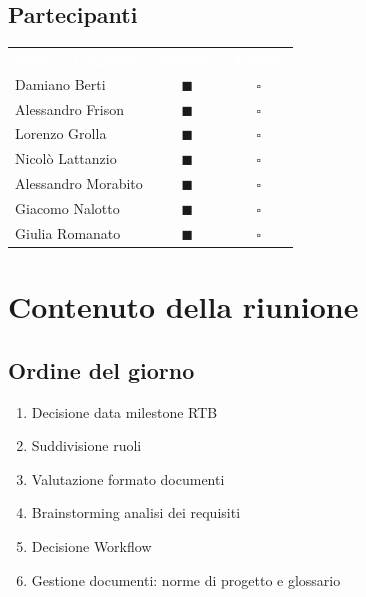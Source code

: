 \documentclass[a4paper, 11pt]{article}
\begin{document}
\subsection{Partecipanti}
\begin{center}
    \begin{tabular}{>{\raggedright\arraybackslash}p{6cm} c c}
        \rowcolor{AccentColor}
        \textcolor{white}{\textbf{Nome e Cognome}} & 
        \textcolor{white}{\textbf{Presente}} & 
        \textcolor{white}{\textbf{Assente}} \\
        
        Damiano Berti     & \textcolor{AccentColor}{$\blacksquare$}    & $\square$        \\
        Alessandro Frison     & \textcolor{AccentColor}{$\blacksquare$}    & $\square$        \\
        Lorenzo Grolla     & \textcolor{AccentColor}{$\blacksquare$}    & $\square$        \\
        Nicolò Lattanzio    & \textcolor{AccentColor}{$\blacksquare$}    & $\square$        \\
        Alessandro Morabito   & \textcolor{AccentColor}{$\blacksquare$}    & $\square$        \\
        Giacomo Nalotto   & \textcolor{AccentColor}{$\blacksquare$}    & $\square$        \\
        Giulia Romanato   & \textcolor{AccentColor}{$\blacksquare$}    & $\square$        \\
    \end{tabular}
\end{center}

\section{Contenuto della riunione}

\subsection{Ordine del giorno}
\begin{enumerate}
 \item Decisione data milestone RTB
 \item Suddivisione ruoli
 \item Valutazione formato documenti
 \item Brainstorming analisi dei requisiti
 \item Decisione Workflow
 \item Gestione  documenti: norme di progetto e glossario
\end{enumerate}
\end{document}
